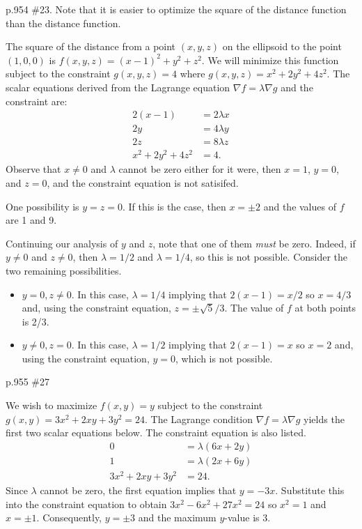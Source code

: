 \begin{practice}p.954 \#23. Note that it is easier to optimize the square of the distance function than the distance function.\end{practice}
\begin{pracsol}
  The square of the distance from a point $(x,y,z)$ on the ellipsoid to the point $(1,0,0)$ is $f(x,y,z)=(x-1)^2+y^2+z^2$. We will minimize this function subject to the constraint $g(x,y,z)=4$ where $g(x,y,z)=x^2+2y^2+4z^2$. The scalar equations derived from the Lagrange equation $\nabla f=\lambda\nabla g$ and the constraint are:
  \begin{align*}
    2(x-1) &= 2\lambda x\\
    2y &= 4\lambda y\\
    2z &= 8\lambda z\\
    x^2+2y^2+4z^2 &= 4.
  \end{align*}
  Observe that $x\neq 0$ and $\lambda$ cannot be zero either for it were, then $x=1$, $y=0$, and $z=0$, and the constraint equation is not satisifed.

  One possibility is $y=z=0$. If this is the case, then $x=\pm 2$ and the values of $f$ are 1 and 9.

  Continuing our analysis of $y$ and $z$, note that one of them \emph{must} be zero. Indeed, if $y\neq 0$ and $z\neq 0$, then $\lambda=1/2$ and $\lambda=1/4$, so this is not possible. Consider the two remaining possibilities.
  \begin{itemize}
    \item $y=0,z\neq 0$. In this case, $\lambda=1/4$ implying that $2(x-1)=x/2$ so $x=4/3$ and, using the constraint equation, $z=\pm\sqrt5/3$. The value of $f$ at both points is 2/3.
    \item $y\neq 0,z=0$. In this case, $\lambda=1/2$ implying that $2(x-1)=x$ so $x=2$ and, using the constraint equation, $y=0$, which is not possible.
  \end{itemize}
\end{pracsol}
\begin{practice}p.955 \#27\end{practice}
\begin{pracsol}
  We wish to maximize $f(x,y)=y$ subject to the constraint $g(x,y)=3x^2+2xy+3y^2=24$. The Lagrange condition $\nabla f=\lambda\nabla g$ yields the first two scalar equations below. The constraint equation is also listed.
  \begin{align*}
    0 &= \lambda(6x+2y)\\
    1 &= \lambda(2x+6y)\\
    3x^2+2xy+3y^2 &= 24.
  \end{align*}
  Since $\lambda$ cannot be zero, the first equation implies that $y=-3x$. Substitute this into the constraint equation to obtain $3x^2-6x^2+27x^2=24$ so $x^2=1$ and $x=\pm 1$. Consequently, $y=\pm 3$ and the maximum $y$-value is 3.
\end{pracsol}

